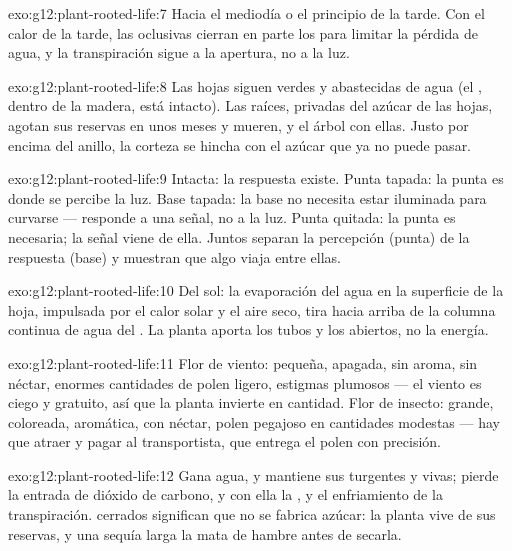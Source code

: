 \begin{solution}{exo:g12:plant-rooted-life:7}
Hacia el mediodía o el principio de la tarde. Con el calor de la tarde,
las  oclusivas cierran en parte los  para limitar la
pérdida de agua, y la transpiración sigue a la apertura, no a la luz.
\end{solution}

\begin{solution}{exo:g12:plant-rooted-life:8}
Las hojas siguen verdes y abastecidas de agua (el , dentro de la
madera, está intacto). Las raíces, privadas del azúcar de las hojas,
agotan sus reservas en unos meses y mueren, y el árbol con ellas. Justo
por encima del anillo, la corteza se hincha con el azúcar que ya no
puede pasar.
\end{solution}

\begin{solution}{exo:g12:plant-rooted-life:9}
Intacta: la respuesta existe. Punta tapada: la punta es donde se
percibe la luz. Base tapada: la base no necesita estar iluminada para
curvarse --- responde a una señal, no a la luz. Punta quitada: la punta
es necesaria; la señal viene de ella. Juntos separan la percepción
(punta) de la respuesta (base) y muestran que algo viaja entre ellas.
\end{solution}

\begin{solution}{exo:g12:plant-rooted-life:10}
Del sol: la evaporación del agua en la superficie de la hoja, impulsada
por el calor solar y el aire seco, tira hacia arriba de la columna
continua de agua del . La planta aporta los tubos y los 
abiertos, no la energía.
\end{solution}

\begin{solution}{exo:g12:plant-rooted-life:11}
Flor de viento: pequeña, apagada, sin aroma, sin néctar, enormes
cantidades de polen ligero, estigmas plumosos --- el viento es ciego y
gratuito, así que la planta invierte en cantidad. Flor de insecto:
grande, coloreada, aromática, con néctar, polen pegajoso en cantidades
modestas --- hay que atraer y pagar al transportista, que entrega el
polen con precisión.
\end{solution}

\begin{solution}{exo:g12:plant-rooted-life:12}
Gana agua, y mantiene sus  turgentes y vivas; pierde la entrada
de dióxido de carbono, y con ella la , y el enfriamiento de
la transpiración.  cerrados significan que no se fabrica azúcar:
la planta vive de sus reservas, y una sequía larga la mata de hambre
antes de secarla.
\end{solution}


